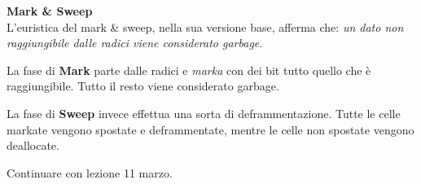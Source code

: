 \documentclass{article}
\begin{document}
\vspace{14pt}
\textbf{Mark \& Sweep}\\
L'euristica del mark \& sweep, nella sua versione base, afferma che: \textit{un dato non raggiungibile dalle radici viene considerato garbage}.

La fase di \textbf{Mark} parte dalle radici e \textit{marka} con dei bit tutto quello che è raggiungibile. Tutto il resto viene considerato garbage.

La fase di \textbf{Sweep} invece effettua una sorta di deframmentazione. Tutte le celle markate vengono spostate e deframmentate, mentre le celle non spostate vengono deallocate.

Continuare con lezione 11 marzo.
\end{document}

